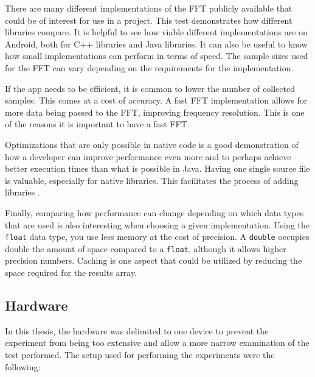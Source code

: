There are many different implementations of the FFT publicly available that could be of interest for use in a project. This test demonstrates how different libraries compare. It is helpful to see how viable different implementations are on Android, both for C++ libraries and Java libraries. It can also be useful to know how small implementations can perform in terms of speed. The sample sizes used for the FFT can vary depending on the requirements for the implementation.

If the app needs to be efficient, it is common to lower the number of collected samples. This comes at a cost of accuracy. A fast FFT implementation allows for more data being passed to the FFT, improving frequency resolution. This is one of the reasons it is important to have a fast FFT.


Optimizations that are only possible in native code is a good demonstration of how a developer can improve performance even more and to perhaps achieve better execution times than what is possible in Java. Having one single source file is valuable, especially for native libraries. This facilitates the process of adding libraries .

Finally, comparing how performance can change depending on which data types that are used is also interesting when choosing a given implementation. Using the \texttt{float} data type, you use less memory at the cost of precision. A \texttt{double} occupies double the amount of space compared to a \texttt{float}, although it allows higher precision numbers. Caching is one aspect that could be utilized by reducing the space required for the results array.

\subsection{Hardware}
In this thesis, the hardware was delimited to one device to prevent the experiment from being too extensive and allow a more narrow examination of the test performed. The setup used for performing the experiments were the following:

